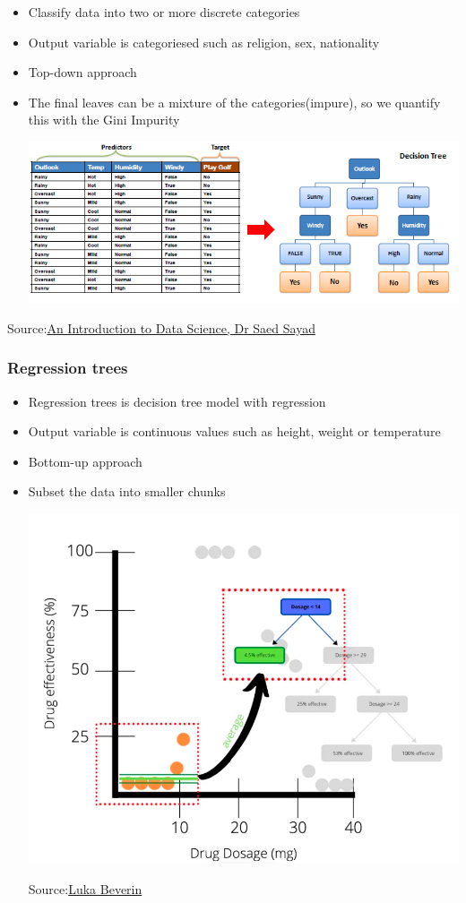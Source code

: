 \documentclass[
  letterpaper,
  DIV=11,
  numbers=noendperiod]{scrreprt}
\begin{document}
\begin{itemize}
\item
  Classify data into two or more discrete categories
\item
  Output variable is categoriesed such as religion, sex, nationality
\item
  Top-down approach
\item
  The final leaves can be a mixture of the categories(impure), so we
  quantify this with the Gini Impurity

  \includegraphics{./images/paste-E98859C4.png}
\end{itemize}

Source:\href{https://www.saedsayad.com/decision_tree.htm}{An
Introduction to Data Science, Dr Saed Sayad}

\hypertarget{regression-trees}{%
\subsubsection{Regression trees}\label{regression-trees}}

\begin{itemize}
\item
  Regression trees is decision tree model with regression
\item
  Output variable is continuous values such as height, weight or
  temperature
\item
  Bottom-up approach
\item
  Subset the data into smaller chunks

  \includegraphics{./images/paste-F95DFBD4.png}

  Source:\href{https://medium.datadriveninvestor.com/how-do-regression-trees-work-94999c5105d}{Luka
  Beverin}
\end{itemize}
\end{document}
